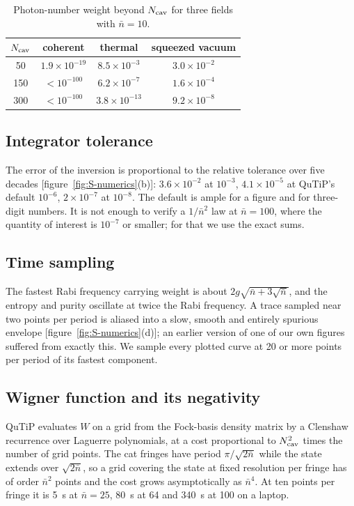 \documentclass{iopjournal}
\newcommand{\nbar}{\bar{n}}
\begin{document}
\begin{table}
\centering
\caption{Photon-number weight beyond $N_{\rm cav}$ for three fields with $\nbar = 10$.}
\begin{tabular}{cccc}
\hline
$N_{\rm cav}$ & coherent & thermal & squeezed vacuum \\
\hline
50 & $1.9\times10^{-19}$ & $8.5\times10^{-3}$ & $3.0\times10^{-2}$ \\
150 & $<10^{-100}$ & $6.2\times10^{-7}$ & $1.6\times10^{-4}$ \\
300 & $<10^{-100}$ & $3.8\times10^{-13}$ & $9.2\times10^{-8}$ \\
\hline
\end{tabular}
\label{tab:S-tails}
\end{table}

\subsection{Integrator tolerance}
The error of the inversion is proportional to the relative tolerance over five decades [figure~\ref{fig:S-numerics}(b)]: $3.6\times10^{-2}$ at $10^{-3}$, $4.1\times10^{-5}$ at QuTiP's default $10^{-6}$, $2\times10^{-7}$ at $10^{-8}$. The default is ample for a figure and for three-digit numbers. It is not enough to verify a $1/\nbar^2$ law at $\nbar = 100$, where the quantity of interest is $10^{-7}$ or smaller; for that we use the exact sums.

\subsection{Time sampling}
The fastest Rabi frequency carrying weight is about $2g\sqrt{\nbar+3\sqrt{\nbar}}$, and the entropy and purity oscillate at twice the Rabi frequency. A trace sampled near two points per period is aliased into a slow, smooth and entirely spurious envelope [figure~\ref{fig:S-numerics}(d)]; an earlier version of one of our own figures suffered from exactly this. We sample every plotted curve at 20 or more points per period of its fastest component.

\subsection{Wigner function and its negativity}
QuTiP evaluates $W$ on a grid from the Fock-basis density matrix by a Clenshaw recurrence over Laguerre polynomials, at a cost proportional to $N_{\rm cav}^2$ times the number of grid points. The cat fringes have period $\pi/\sqrt{2\nbar}$ while the state extends over $\sqrt{2\nbar}$, so a grid covering the state at fixed resolution per fringe has of order $\nbar^2$ points and the cost grows asymptotically as $\nbar^4$. At ten points per fringe it is 5~s at $\nbar = 25$, 80~s at 64 and 340~s at 100 on a laptop.
\end{document}
